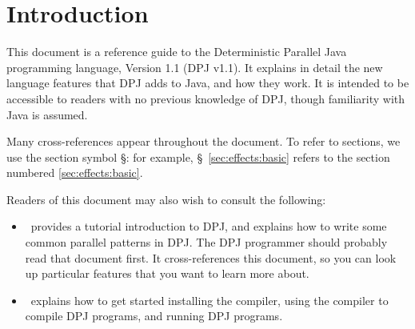 \section{Introduction%
\label{sec:introduction}}

This document is a reference guide to the Deterministic Parallel Java
programming language, Version 1.1 (DPJ v1.1).  It explains in detail
the new language features that DPJ adds to Java, and how they work.
It is intended to be accessible to readers with no previous knowledge
of DPJ, though familiarity with Java is assumed.

Many cross-references appear throughout the document.  To refer to
sections, we use the section symbol \S: for example,
\S~\ref{sec:effects:basic} refers to the section numbered
\ref{sec:effects:basic}.

Readers of this document may also wish to consult the following:
%
\begin{itemize}
%
\item \tutorial\ provides a tutorial introduction to DPJ, and
  explains how to write some common parallel patterns in DPJ.  The DPJ
  programmer should probably read that document first.  It
  cross-references this document, so you can look up particular
  features that you want to learn more about.
%
\item \installmanual\ explains how to get started installing the
   compiler, using the compiler to compile DPJ programs, and
  running DPJ programs.
%
\end{itemize}

